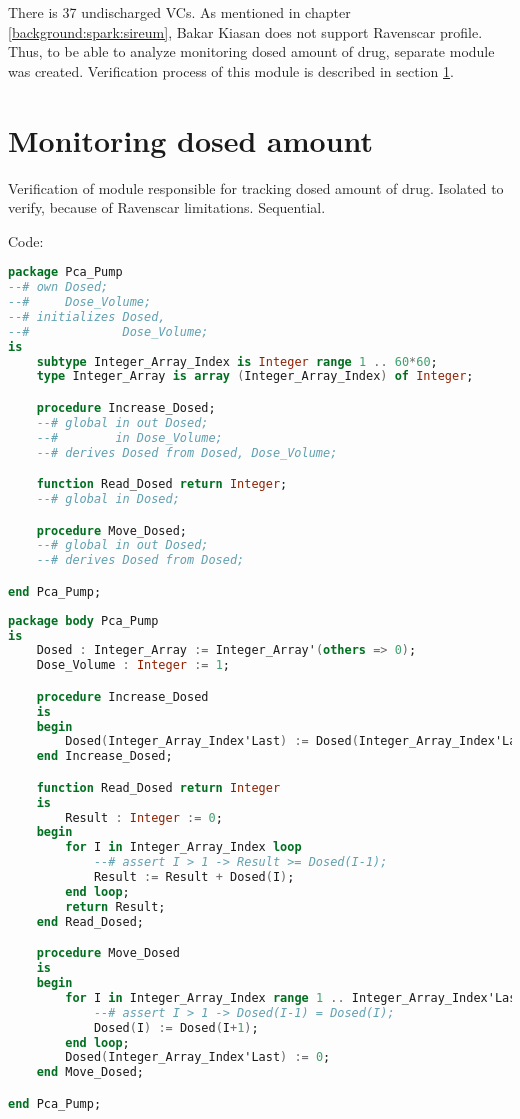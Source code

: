 There is 37 undischarged VCs. As mentioned in chapter \ref{background:spark:sireum}, Bakar Kiasan does not support Ravenscar profile. Thus, to be able to analyze monitoring dosed amount of drug, separate module was created. Verification process of this module is described in section \ref{verification:pcapump:monitoring}.


\section{Monitoring dosed amount}
\label{verification:pcapump:monitoring}

Verification of module responsible for tracking dosed amount of drug.
Isolated to verify, because of Ravenscar limitations.
Sequential.

Code:

\begin{lstlisting}[language=ada, frame=single, gobble=0, caption={Dose monitor module specification}, label={listing:pcapump_dosemonitor_spec}]
package Pca_Pump
--# own Dosed;
--#     Dose_Volume;
--# initializes Dosed,
--#             Dose_Volume;
is
    subtype Integer_Array_Index is Integer range 1 .. 60*60;
    type Integer_Array is array (Integer_Array_Index) of Integer;

    procedure Increase_Dosed;
    --# global in out Dosed;
    --#        in Dose_Volume;
    --# derives Dosed from Dosed, Dose_Volume;

    function Read_Dosed return Integer;
    --# global in Dosed;

    procedure Move_Dosed;
    --# global in out Dosed;
    --# derives Dosed from Dosed;

end Pca_Pump;
\end{lstlisting}


\begin{lstlisting}[language=ada, frame=single, gobble=0, caption={Dose monitor module body}, label={listing:pcapump_dosemonitor_body}]
package body Pca_Pump
is
    Dosed : Integer_Array := Integer_Array'(others => 0);
    Dose_Volume : Integer := 1;

    procedure Increase_Dosed
    is
    begin
        Dosed(Integer_Array_Index'Last) := Dosed(Integer_Array_Index'Last) + Dose_Volume;
    end Increase_Dosed;

    function Read_Dosed return Integer
    is
        Result : Integer := 0;
    begin
        for I in Integer_Array_Index loop
            --# assert I > 1 -> Result >= Dosed(I-1);
            Result := Result + Dosed(I);
        end loop;
        return Result;
    end Read_Dosed;

    procedure Move_Dosed
    is
    begin
        for I in Integer_Array_Index range 1 .. Integer_Array_Index'Last-1 loop
            --# assert I > 1 -> Dosed(I-1) = Dosed(I);
            Dosed(I) := Dosed(I+1);
        end loop;
        Dosed(Integer_Array_Index'Last) := 0;
    end Move_Dosed;

end Pca_Pump;

\end{lstlisting}


